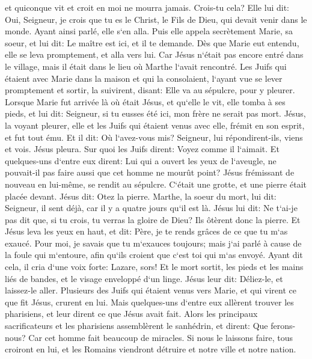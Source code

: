 \verse et quiconque vit et croit en moi ne mourra jamais. Crois-tu cela? 
\verse Elle lui dit: Oui, Seigneur, je crois que tu es le Christ, le Fils de Dieu, qui devait venir dans le monde. 
\verse Ayant ainsi parlé, elle s`en alla. Puis elle appela secrètement Marie, sa soeur, et lui dit: Le maître est ici, et il te demande. 
\verse Dès que Marie eut entendu, elle se leva promptement, et alla vers lui. 
\verse Car Jésus n`était pas encore entré dans le village, mais il était dans le lieu où Marthe l`avait rencontré. 
\verse Les Juifs qui étaient avec Marie dans la maison et qui la consolaient, l`ayant vue se lever promptement et sortir, la suivirent, disant: Elle va au sépulcre, pour y pleurer. 
\verse Lorsque Marie fut arrivée là où était Jésus, et qu`elle le vit, elle tomba à ses pieds, et lui dit: Seigneur, si tu eusses été ici, mon frère ne serait pas mort. 
\verse Jésus, la voyant pleurer, elle et les Juifs qui étaient venus avec elle, frémit en son esprit, et fut tout ému. 
\verse Et il dit: Où l`avez-vous mis? Seigneur, lui répondirent-ils, viens et vois. 
\verse Jésus pleura. 
\verse Sur quoi les Juifs dirent: Voyez comme il l`aimait. 
\verse Et quelques-uns d`entre eux dirent: Lui qui a ouvert les yeux de l`aveugle, ne pouvait-il pas faire aussi que cet homme ne mourût point? 
\verse Jésus frémissant de nouveau en lui-même, se rendit au sépulcre. C`était une grotte, et une pierre était placée devant. 
\verse Jésus dit: Otez la pierre. Marthe, la soeur du mort, lui dit: Seigneur, il sent déjà, car il y a quatre jours qu`il est là. 
\verse Jésus lui dit: Ne t`ai-je pas dit que, si tu crois, tu verras la gloire de Dieu? 
\verse Ils ôtèrent donc la pierre. Et Jésus leva les yeux en haut, et dit: Père, je te rends grâces de ce que tu m`as exaucé. 
\verse Pour moi, je savais que tu m`exauces toujours; mais j`ai parlé à cause de la foule qui m`entoure, afin qu`ils croient que c`est toi qui m`as envoyé. 
\verse Ayant dit cela, il cria d`une voix forte: Lazare, sors! 
\verse Et le mort sortit, les pieds et les mains liés de bandes, et le visage enveloppé d`un linge. Jésus leur dit: Déliez-le, et laissez-le aller. 
\verse Plusieurs des Juifs qui étaient venus vers Marie, et qui virent ce que fit Jésus, crurent en lui. 
\verse Mais quelques-uns d`entre eux allèrent trouver les pharisiens, et leur dirent ce que Jésus avait fait. 
\verse Alors les principaux sacrificateurs et les pharisiens assemblèrent le sanhédrin, et dirent: Que ferons-nous? Car cet homme fait beaucoup de miracles. 
\verse Si nous le laissons faire, tous croiront en lui, et les Romains viendront détruire et notre ville et notre nation. 
